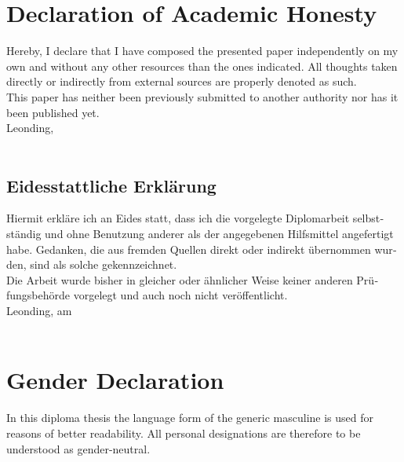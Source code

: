 \section*{Declaration of Academic Honesty} %
Hereby, I declare that I have composed the presented paper independently on my own and without any other resources than the ones indicated. All thoughts taken directly or indirectly from external sources are properly denoted as such.\\
This paper has neither been previously submitted to another authority nor has it been published yet. \\[1em]
Leonding, \duedateen \\[5em]
\ifthenelse{\isundefined{\firstauthor}}{}{\firstauthor}
\ifthenelse{\isundefined{\secondauthor}}{}{\kern-1ex, \secondauthor}
\ifthenelse{\isundefined{\thirdauthor}}{}{\kern-1ex, \thirdauthor}
\ifthenelse{\isundefined{\fourthauthor}}{}{\kern-1ex, \fourthauthor} \\[5em]

\begin{otherlanguage}{german}
\section*{Eidesstattliche Erklärung}
Hiermit erkläre ich an Eides statt, dass ich die vorgelegte Diplomarbeit selbstständig und ohne Benutzung anderer als der angegebenen Hilfsmittel angefertigt habe. Gedanken, die aus fremden Quellen direkt oder indirekt übernommen wurden, sind als solche gekennzeichnet.\\
Die Arbeit wurde bisher in gleicher oder ähnlicher Weise keiner anderen Prüfungsbehörde vorgelegt und auch noch nicht veröffentlicht. \\[1em]
Leonding, am \duedatede \\[5em]
\ifthenelse{\isundefined{\firstauthor}}{}{\firstauthor}
\ifthenelse{\isundefined{\secondauthor}}{}{\kern-1ex, \secondauthor}
\ifthenelse{\isundefined{\thirdauthor}}{}{\kern-1ex, \thirdauthor}
\ifthenelse{\isundefined{\fourthauthor}}{}{\kern-1ex, \fourthauthor} \\[5em]
\end{otherlanguage}

\section*{Gender Declaration} %
In this diploma thesis the language form of the generic masculine is used for reasons of better readability. All personal designations are therefore to be understood as gender-neutral.

